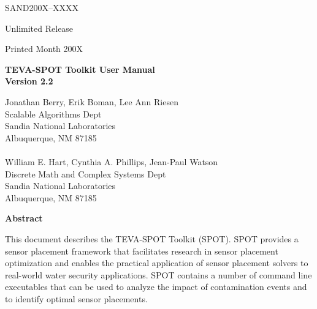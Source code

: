 \documentclass[11pt]{article}
\begin{document}
\pagestyle{empty}
\setcounter{page}{2}


\begin{center}
SAND200X--XXXX

Unlimited Release

Printed Month 200X
\end{center}

\vspace{0.8in}

\begin{center}
{\bf \LARGE TEVA-SPOT Toolkit User Manual\\[1ex]\Large Version 2.2}
\vspace*{0.4in}

Jonathan Berry, Erik Boman, Lee Ann Riesen\\
Scalable Algorithms Dept\\
Sandia National Laboratories\\
Albuquerque, NM 87185\\
\mbox{}\\
William E. Hart, Cynthia A. Phillips, Jean-Paul Watson\\
Discrete Math and Complex Systems Dept\\
Sandia National Laboratories\\
Albuquerque, NM 87185


\vspace*{1.0in}

{\bf\large Abstract}
\end{center}
This document describes the TEVA-SPOT Toolkit (SPOT). SPOT provides a sensor 
placement framework that facilitates research in sensor placement 
optimization 
and enables the practical application of sensor placement solvers to 
real-world 
water security applications.
SPOT contains a number of command line executables
that can be used to 
analyze the impact of contamination events and to identify optimal
sensor placements.
%

\vfill
\newpage

\tableofcontents

{}



\newpage


\newpage




\appendix


\end{document}
